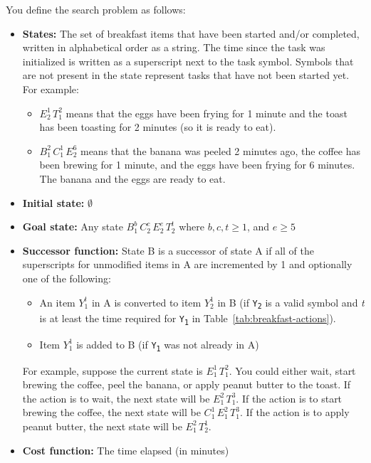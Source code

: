 \documentclass[12pt]{article}
\begin{document}
You define the search problem as follows:

\begin{itemize}
    \item \textbf{States:} The set of breakfast items that have been started and/or completed, written in alphabetical order as a string. The time since the task was initialized is written as a superscript next to the task symbol. Symbols that are not present in the state represent tasks that have not been started yet. For example:
    \begin{itemize}
        \item $E_2^1\,T_1^2$ means that the eggs have been frying for 1 minute and the toast has been toasting for 2 minutes (so it is ready to eat).
        \item $B_1^2\,C_1^1\,E_2^6$ means that the banana was peeled 2 minutes ago, the coffee has been brewing for 1 minute, and the eggs have been frying for 6 minutes. The banana and the eggs are ready to eat.
    \end{itemize}
    \item \textbf{Initial state:} $\emptyset$  
    \item \textbf{Goal state:} Any state $B_1^b\,C_2^c\,E_2^e\,T_2^t$ where $b,c,t \geq 1$, and $e \geq 5$
    \item \textbf{Successor function:} State B is a successor of state A if all of the superscripts for unmodified items in A are incremented by 1 and optionally one of the following:
    \begin{itemize}
        \item An item $Y_1^t$ in A is converted to item $Y_2^1$ in B (if \texttt{Y\textsubscript{2}} is a valid symbol and \textit{t} is at least the time required for \texttt{Y\textsubscript{1}} in Table~\ref{tab:breakfast-actions}).
        \item Item $Y_1^1$ is added to B (if \texttt{Y\textsubscript{1}} was not already in A)
    \end{itemize}
    For example, suppose the current state is $E_1^1\,T_1^2$. You could either wait, start brewing the coffee, peel the banana, or apply peanut butter to the toast. If the action is to wait, the next state will be $E_1^2\,T_1^3$. If the action is to start brewing the coffee, the next state will be $C_1^1\,E_1^2\,T_1^3$. If the action is to apply peanut butter, the next state will be $E_1^2\,T_2^1$.
    \item \textbf{Cost function:} The time elapsed (in minutes)
\end{itemize}
\end{document}

